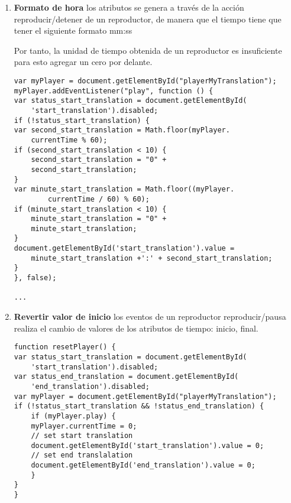 \begin{enumerate}

\item \textbf{Formato de hora} los atributos se genera a través de la acción
reproducir/detener de un reproductor, de manera que el tiempo tiene que
tener el siguiente formato mm:ss

Por tanto, la unidad de tiempo obtenida de un reproductor es insuficiente para
esto agregar un cero por delante.

\begin{lstlisting}[caption={Generador de formato para minuto y segundo.}]
var myPlayer = document.getElementById("playerMyTranslation");
myPlayer.addEventListener("play", function () {
var status_start_translation = document.getElementById(
    'start_translation').disabled;
if (!status_start_translation) {
var second_start_translation = Math.floor(myPlayer.
    currentTime % 60);
if (second_start_translation < 10) {
    second_start_translation = "0" + 
    second_start_translation;
}
var minute_start_translation = Math.floor((myPlayer.
        currentTime / 60) % 60);
if (minute_start_translation < 10) {
    minute_start_translation = "0" + 
    minute_start_translation;
}
document.getElementById('start_translation').value = 
    minute_start_translation +':' + second_start_translation;
}
}, false);

...
\end{lstlisting}

\item \textbf{Revertir valor de inicio} los eventos de un reproductor
reproducir/pausa realiza el cambio de valores de los atributos de tiempo:
inicio, final.

\begin{lstlisting}[caption={Revertir valores para: tiempo y reproductor.}]
function resetPlayer() {
var status_start_translation = document.getElementById(
    'start_translation').disabled;
var status_end_translation = document.getElementById(
    'end_translation').disabled;
var myPlayer = document.getElementById("playerMyTranslation");
if (!status_start_translation && !status_end_translation) {
    if (myPlayer.play) {
    myPlayer.currentTime = 0;
    // set start translation
    document.getElementById('start_translation').value = 0;
    // set end translalation
    document.getElementById('end_translation').value = 0;
    }
}
}
\end{lstlisting}

\end{enumerate}

